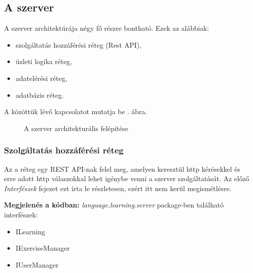 \documentclass[11pt, a4paper]{article}
\begin{document}
    \subsection{A szerver}
    A szerver architektúrája négy fő részre bontható. Ezek az alábbiak:
    \begin{itemize}
    	\item szolgáltatás hozzáférési réteg (Rest API),
    	\item üzleti logika réteg,
    	\item adatelérési réteg,
    	\item adatbázis réteg.
    \end{itemize}
    A közöttük lévő kapcsolatot mutatja be . ábra.
    
    \begin{figure}[htbp]
    	\center
    	\caption{A szerver architekturális felépítése}
    	\label{fig:server_arch}
    \end{figure}
    
    \subsubsection{Szolgáltatás hozzáférési réteg}
    Az a réteg egy REST API-nak felel meg, amelyen keresztül http kérésekkel és erre adott http válaszokkal lehet igénybe venni a szerver szolgáltatását. Az előző \textit{Interfészek} fejezet ezt írta le részletesen, ezért itt nem kerül megismétlésre.
    
    \textbf{Megjelenés a kódban:} \textit{language.learning.server} package-ben található interfészek: 
    \begin{itemize}
    	\item ILearning
    	\item IExerciseManager
    	\item IUserManager
    \end{itemize}
    
\end{document}
